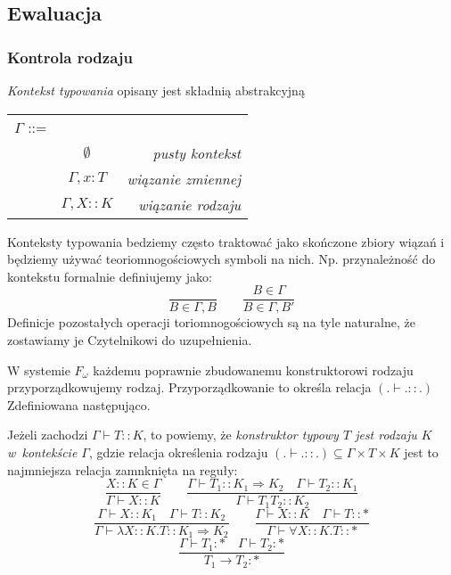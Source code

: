 \documentclass[11pt,leqno]{article}
\begin{document}
\subsection{Ewaluacja}

\subsubsection{Kontrola rodzaju}

\begin{definicja}
	\emph{Kontekst typowania} opisany jest składnią abstrakcyjną
	
	\begin{tabular}{ | l c r | }
		\hline
		$\Gamma$ ::= & & \\
		& $\emptyset$ & \textit{pusty kontekst} \\
		& $\Gamma,x:T$& \textit{wiązanie zmiennej} \\ 
		& $\Gamma,X::K$& \textit{wiązanie rodzaju} \\ 
		\hline
	\end{tabular}
	
	Konteksty typowania bedziemy często traktować jako skończone zbiory wiązań i będziemy
	używać teoriomnogościowych symboli na nich. Np. przynależność do kontekstu formalnie
	definiujemy jako:
	\[
		\frac{}{B \in \Gamma,B}
		\qquad
		\frac{B \in \Gamma}{B \in \Gamma,B'}
	\]
	Definicje pozostałych operacji toriomnogościowych są na tyle naturalne, że zostawiamy
	je Czytelnikowi do uzupełnienia.
\end{definicja}

W systemie $F_\omega$ każdemu poprawnie zbudowanemu konstruktorowi rodzaju przyporządkowujemy rodzaj.
Przyporządkowanie to określa relacja $(.\vdash.::.)$ Zdefiniowana następująco.

\begin{definicja}
	Jeżeli zachodzi $\Gamma \vdash T :: K$, to powiemy, że
	\emph {konstruktor typowy $T$ jest rodzaju $K$ w~kontekście $\Gamma$}, gdzie
	relacja określenia rodzaju $(.\vdash.::.) \subseteq \Gamma \times T \times K$
	jest to najmniejsza relacja zamnknięta na reguły:
	\[
		\frac{X::K \in \Gamma}{\Gamma \vdash X::K}
		\qquad
		\frac{\Gamma \vdash T_1 :: K_{1} \Rightarrow K_{2} \hspace{1em} \Gamma \vdash T_2 :: K_{1}}{\Gamma \vdash T_1 T_2 :: K_{2}}
	\]
	\[
		\frac{\Gamma \vdash X :: K_1 \hspace{1em} \Gamma \vdash T :: K_2}{\Gamma \vdash \lambda X::K. T :: K_{1} \Rightarrow K_{2}}
		\qquad
		\frac{\Gamma \vdash X :: K \hspace{1em} \Gamma \vdash T :: \ast}{\Gamma \vdash \forall X::K. T :: \ast}
	\]
	\[
		\frac{\Gamma \vdash T_1 : \ast \hspace{1em} \Gamma \vdash T_2 : \ast}{T_1 \rightarrow T_2 : \ast}
	\]	
\end{definicja}
\end{document}
